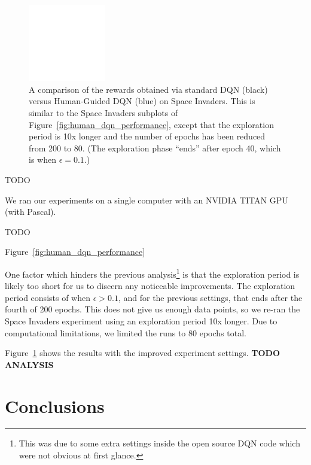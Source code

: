 \documentclass[letterpaper, 10pt, conference]{ieeeconf}
\begin{document}
\begin{figure}[t]
\centering
\includegraphics[width=0.30\textwidth]{figures/empty.png}
\caption{\footnotesize
A comparison of the rewards obtained via standard DQN (black) versus
Human-Guided DQN (blue) on Space Invaders. This is similar to the Space Invaders
subplots of Figure~\ref{fig:human_dqn_performance}, except that the exploration
period is 10x longer and the number of epochs has been reduced from 200 to 80.
(The exploration phase ``ends'' after epoch 40, which is when $\epsilon=0.1$.)
}
\label{fig:sp_inv_longer_exploration}
\end{figure}

TODO

We ran our experiments on a single computer with an NVIDIA TITAN GPU (with
Pascal).

TODO

Figure~\ref{fig:human_dqn_performance}

One factor which hinders the previous analysis\footnote{This was due to some
extra settings inside the open source DQN code which were not obvious at first
glance.} is that the exploration period is likely too short for us to discern
any noticeable improvements. The exploration period consists of when
$\epsilon>0.1$, and for the previous settings, that ends after the fourth of 200
epochs. This does not give us enough data points, so we re-ran the Space
Invaders experiment using an exploration period 10x longer. Due to computational
limitations, we limited the runs to 80 epochs total.

Figure~\ref{fig:sp_inv_longer_exploration} shows the results with the improved
experiment settings. \textbf{TODO ANALYSIS}




\section{Conclusions}\label{sec:conclusions}
\end{document}
